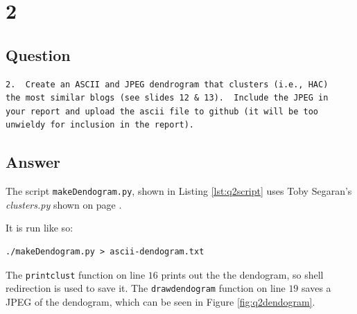 \documentclass[letterpaper,11pt]{article}
\begin{document}


\newpage

\section*{2}

\subsection*{Question}

\begin{verbatim}
2.  Create an ASCII and JPEG dendrogram that clusters (i.e., HAC)
the most similar blogs (see slides 12 & 13).  Include the JPEG in
your report and upload the ascii file to github (it will be too
unwieldy for inclusion in the report).
\end{verbatim}

\subsection*{Answer}

The script \verb+makeDendogram.py+, shown in Listing \ref{lst:q2script} uses Toby Segaran's \emph{clusters.py} \cite{pci} shown on page \pageref{lst:appSegaran2}.



It is run like so:
\begin{lstlisting}[frame=single]
./makeDendogram.py > ascii-dendogram.txt
\end{lstlisting}

The \verb+printclust+ function on line $16$ prints out the the dendogram, so shell redirection is used to save it.  The \verb+drawdendogram+ function on line $19$ saves a JPEG of the dendogram, which can be seen in Figure \ref{fig:q2dendogram}.
\end{document}
